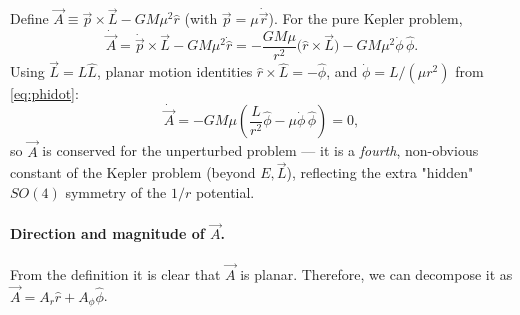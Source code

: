 \documentclass[11pt]{article}
\newcommand{\vecr}{\vec r}
\newcommand{\vecL}{\vec L}
\newcommand{\vecA}{\vec A}
\newcommand{\vecp}{\vec p}
\newcommand{\rhat}{\hat r}
\newcommand{\phihat}{\hat\phi}
\begin{document}
Define $\vecA \equiv \vecp\times\vecL - GM\mu^2\rhat$ (with $\vecp=\mu\dot{\vecr}$). For the pure Kepler problem,
\[
\dot{\vecA} = \dot{\vecp}\times\vecL - GM\mu^2\dot{\rhat}
= -\frac{GM\mu}{r^2}\big(\rhat\times\vecL\big) - GM\mu^2\dot\phi\,\phihat.
\]
Using $\vecL=L\hat L$, planar motion identities $\rhat\times\hat L=-\phihat$, and $\dot\phi=L/(\mu r^2)$ from \eqref{eq:phidot}:
\[
\dot{\vecA} = -GM\mu\left(\frac{L}{r^2}\phihat - \mu\dot\phi\,\phihat\right)=0,
\]
so $\vecA$ is conserved for the unperturbed problem — it is a \emph{fourth}, non-obvious constant of the Kepler problem (beyond $E,\vecL$), reflecting the extra "hidden" $SO(4)$ symmetry of the $1/r$ potential.

\paragraph{Direction and magnitude of $\vecA$.} From the definition it is clear that $\vecA$ is planar. Therefore, we can decompose it as $\vecA=A_r\hat{r}+A_{\phi}\hat{\phi}$.
\end{document}
